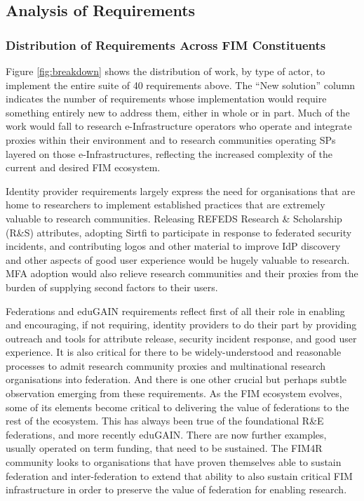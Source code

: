 \documentclass[fleqn,10pt]{wlscirep}
\begin{document}
{\subsection{Analysis of Requirements}
\subsubsection{Distribution of Requirements Across FIM Constituents}

Figure \ref{fig:breakdown} shows the distribution of work, by type of actor, to implement the entire suite of 40 requirements above. The “New solution” column indicates the number of requirements whose implementation would require something entirely new to address them, either in whole or in part. Much of the work would fall to research e-Infrastructure operators who operate and integrate proxies within their environment and to research communities operating SPs layered on those e-Infrastructures, reflecting the increased complexity of the current and desired FIM ecosystem. 

Identity provider requirements largely express the need for organisations that are home to researchers to implement established practices that are extremely valuable to research communities. Releasing REFEDS Research \& Scholarship\cite{rns}  (R\&S) attributes, adopting Sirtfi to participate in response to federated security incidents, and contributing logos and other material to improve IdP discovery and other aspects of good user experience would be hugely valuable to research. MFA adoption would also relieve research communities and their proxies from the burden of supplying second factors to their users.

Federations and eduGAIN requirements reflect first of all their role in enabling and encouraging, if not requiring, identity providers to do their part by providing outreach and tools for attribute release, security incident response, and good user experience. It is also critical for there to be widely-understood and reasonable processes to admit research community proxies and multinational research organisations into federation. And there is one other crucial but perhaps subtle observation emerging from these requirements. As the FIM ecosystem evolves, some of its elements become critical to delivering the value of federations to the rest of the ecosystem. This has always been true of the foundational R\&E federations, and more recently eduGAIN. There are now further examples, usually operated on term funding, that need to be sustained. The FIM4R community looks to organisations that have proven themselves able to sustain federation and inter-federation to extend that ability to also sustain critical FIM infrastructure in order to preserve the value of federation for enabling research. 

}
\end{document}

